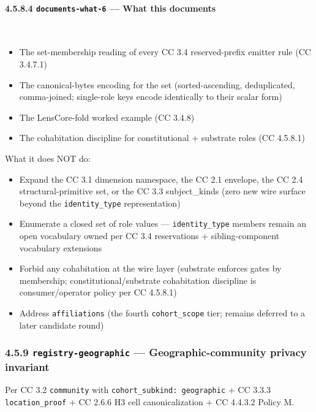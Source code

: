 \documentclass[11pt]{article}
\begin{document}
\paragraph{4.5.8.4 \texttt{documents-what-6} — What this documents}\mbox{}\\


\begin{itemize}\setlength\itemsep{0pt}
\item The set-membership reading of every CC 3.4 reserved-prefix emitter rule (CC 3.4.7.1)
\item The canonical-bytes encoding for the set (sorted-ascending, deduplicated, comma-joined; single-role keys encode identically to their scalar form)
\item The LensCore-fold worked example (CC 3.4.8)
\item The cohabitation discipline for constitutional + substrate roles (CC 4.5.8.1)
\end{itemize}


What it does NOT do:

\begin{itemize}\setlength\itemsep{0pt}
\item Expand the CC 3.1 dimension namespace, the CC 2.1 envelope, the CC 2.4 structural-primitive set, or the CC 3.3 subject\_kinds (zero new wire surface beyond the \texttt{identity\_type} representation)
\item Enumerate a closed set of role values — \texttt{identity\_type} members remain an open vocabulary owned per CC 3.4 reservations + sibling-component vocabulary extensions
\item Forbid any cohabitation at the wire layer (substrate enforces gates by membership; constitutional/substrate cohabitation discipline is consumer/operator policy per CC 4.5.8.1)
\item Address \texttt{affiliations} (the fourth \texttt{cohort\_scope} tier; remains deferred to a later candidate round)
\end{itemize}


\subsubsection*{4.5.9 \texttt{registry-geographic} — Geographic-community privacy invariant}


Per CC 3.2 \texttt{community} with \texttt{cohort\_subkind: geographic} + CC 3.3.3 \texttt{location\_proof} + CC 2.6.6 H3 cell canonicalization + CC 4.4.3.2 Policy M.
\end{document}
